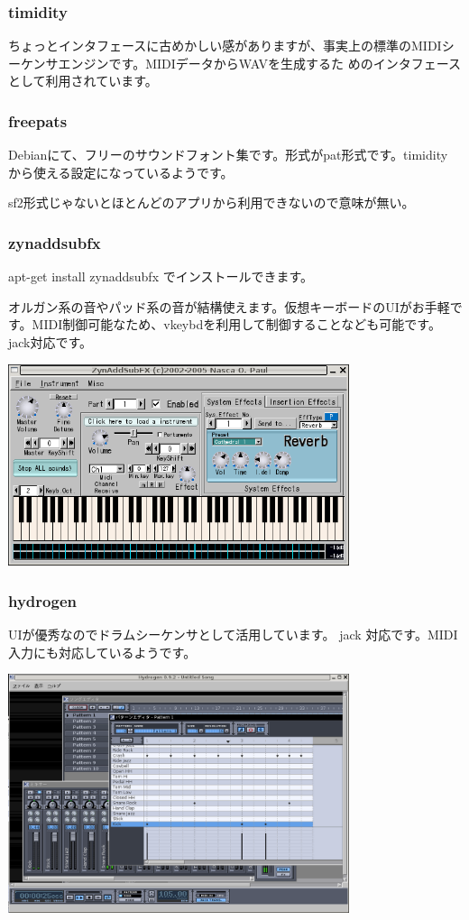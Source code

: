 \documentclass[mingoth,a4paper]{jsarticle}
\begin{document}
\subsubsection{timidity}

ちょっとインタフェースに古めかしい感がありますが、事実上の標準のMIDIシーケンサエンジンです。MIDIデータからWAVを生成するた
めのインタフェースとして利用されています。

\subsubsection{freepats}

Debianにて、フリーのサウンドフォント集です。形式がpat形式です。timidity
から使える設定になっているようです。

sf2形式じゃないとほとんどのアプリから利用できないので意味が無い。

\subsubsection{zynaddsubfx}

apt-get install zynaddsubfx でインストールできます。

オルガン系の音やパッド系の音が結構使えます。仮想キーボードのUIがお手軽で
す。MIDI制御可能なため、vkeybdを利用して制御することなども可能です。
jack対応です。

\includegraphics[width=10cm]{image200602/zynaddsubfx.png}

\subsubsection{hydrogen}

UIが優秀なのでドラムシーケンサとして活用しています。
jack 対応です。MIDI入力にも対応しているようです。

\includegraphics[width=10cm]{image200602/hydrogen.png}
\end{document}
